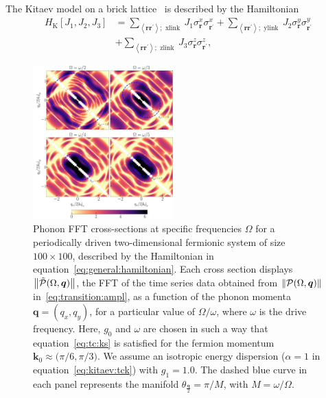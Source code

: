 \documentclass[preprint,5p,times,twocolumn]{elsarticle}
\newcommand{\bmq}{\bm{q}}
\newcommand{\bmr}{\bm{r}}
\begin{document}
The Kitaev model on a brick lattice~\citep{Chen_2008} is described by the Hamiltonian
\begin{align}
    H_{\mathrm{K}}\left[J_{1}, J_{2}, J_{3}\right] &= \sum_{\left\langle\bmr \bmr^{\prime}\right\rangle ; \text { xlink }} J_{1} \sigma_{\mathbf{r}}^{x} \sigma_{{\bmr}^{\prime}}^{x} + \sum_{\left\langle\bmr \bmr^{\prime}\right\rangle ; \text { ylink }} J_{2} \sigma_{\mathbf{r}}^{y} \sigma_{\mathbf{r}^{\prime}}^{y} \nonumber \\
    &+ \sum_{\left\langle{\bmr} \boldsymbol{r}^{\prime}\right\rangle ; \text { zlink }} J_{3} \sigma_{\mathbf{r}}^{z} \sigma_{\mathbf{r}^{\prime}}^{z},
    \label{eq:kitaev}
\end{align}
\begin{figure}[t!]
    \begin{center}
        \includegraphics[width=0.48\textwidth, keepaspectratio]{fig4_2d_tc.png}    
    \end{center}
    \caption{Phonon FFT cross-sections at specific frequencies $\Omega$ for a periodically driven two-dimensional fermionic system of size $100\times 100$, described by the Hamiltonian in equation~\ref{eq:general:hamiltonian}. Each cross section displays $\norm{\tilde{\mathcal{P}}(\Omega, \bmq)}$, the FFT of the time series data obtained from $\norm{\mathcal{P}(\Omega, \bmq)}$ in~\ref{eq:transition:ampl}, as a function of the phonon momenta $\bmq=(q_x, q_y)$, for a particular value of $\Omega/\omega$, where $\omega$ is the drive frequency. Here, $g_0$ and $\omega$ are chosen in such a way that equation~\ref{eq:tc:ks} is satisfied for the fermion momentum $\bm{k}_0\approx \big(\pi/6, \pi/3\big)$. We assume an isotropic energy dispersion ($\alpha=1$ in equation~\ref{eq:kitaev:tck}) with $g_1=1.0$. The dashed blue curve in each panel represents the manifold $\theta_{\frac{\bm{q}}{2}}={\pi}/{M}$, with $M=\omega/\Omega$.}
    \label{fig:2dscattampl}
\end{figure}
\end{document}
